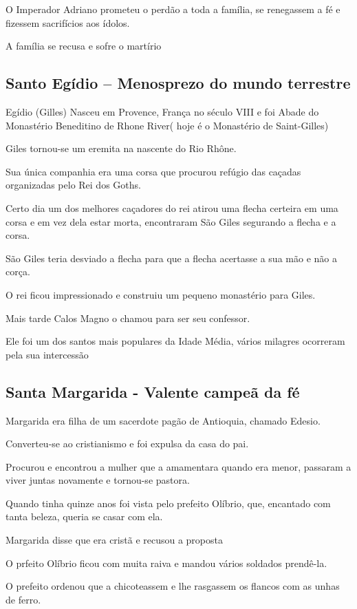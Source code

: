 \documentclass[a4paper,12pt]{extarticle} \usepackage[utf8]{inputenc}
\begin{document}
O Imperador Adriano prometeu o perdão a toda a família, se renegassem a fé e fizessem sacrifícios aos ídolos.

A família se recusa e sofre o martírio


\subsection{Santo Egídio – Menosprezo do mundo terrestre}

Egídio (Gilles) Nasceu em Provence, França no século VIII e foi Abade do Monastério Beneditino de Rhone River( hoje é o Monastério de Saint-Gilles)

Giles tornou-se um eremita na nascente do Rio Rhône.

Sua única companhia era uma corsa que procurou refúgio das caçadas organizadas pelo Rei dos Goths.

Certo dia um dos melhores caçadores do rei atirou uma flecha certeira em uma corsa e em vez dela estar morta, encontraram São Giles segurando a flecha e a corsa.

São Giles teria desviado a flecha para que a flecha acertasse a sua mão e não a corça.

O rei ficou impressionado e construiu um pequeno monastério para Giles.

Mais tarde Calos Magno o chamou para ser seu confessor.

Ele foi um dos santos mais populares da Idade Média, vários milagres ocorreram pela sua intercessão

\subsection{Santa Margarida -  Valente campeã da fé}

Margarida era filha de um sacerdote pagão de Antioquia, chamado Edesio.

Converteu-se ao cristianismo e foi expulsa da casa do pai.

Procurou e encontrou a mulher que a amamentara quando era menor, passaram a viver juntas novamente e tornou-se pastora.

Quando tinha quinze anos foi vista pelo prefeito Olíbrio, que, encantado com tanta beleza, queria se casar com ela.

Margarida disse que era cristã e recusou a proposta

O prfeito Olíbrio ficou com muita raiva e mandou vários soldados prendê-la.

O prefeito ordenou que a chicoteassem e lhe rasgassem os flancos com as unhas de ferro.
\end{document}
